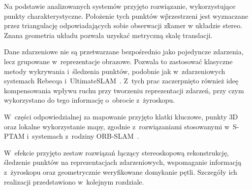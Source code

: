 Na podstawie analizowanych systemów przyjęto rozwiązanie, wykorzystujące punkty charakterystyczne. Położenie tych punktów w\~przestrzeni jest wyznaczane przez triangulację odpowiadających sobie obserwacji z\~kamer w układzie stereo. Znana geometria układu pozwala  uzyskać metryczną skalę translacji.

Dane zdarzeniowe nie są przetwarzane bezpośrednio jako pojedyncze zdarzenia, lecz grupowane w~reprezentacje obrazowe. Pozwala to zastosować klasyczne metody wykrywania i~śledzenia punktów, podobnie jak w~zdarzeniowych systemach Rebecqa i~UltimateSLAM~\cite{rebecq2017eventvio,vidal2018ultimate}. Z~tych prac zaczerpnięto również ideę kompensowania wpływu ruchu przy tworzeniu reprezentacji zdarzeń, przy czym wykorzystano do tego informację o~obrocie z~żyroskopu.

W~części odpowiedzialnej za mapowanie przyjęto klatki kluczowe, punkty 3D oraz lokalne wykorzystanie mapy, zgodnie z~rozwiązaniami stosowanymi w~S-PTAM i~systemach z~rodziny ORB-SLAM~\cite{pire2017sptam,murartal2015orbslam,murartal2017orbslam2}.

W~efekcie przyjęto zestaw rozwiązań łączący stereoskopową rekonstrukcję, śledzenie punktów na reprezentacjach zdarzeniowych, wspomaganie informacją z~żyroskopu oraz geometrycznie weryfikowane domykanie pętli. Szczegóły ich realizacji przedstawiono w~kolejnym rozdziale.
